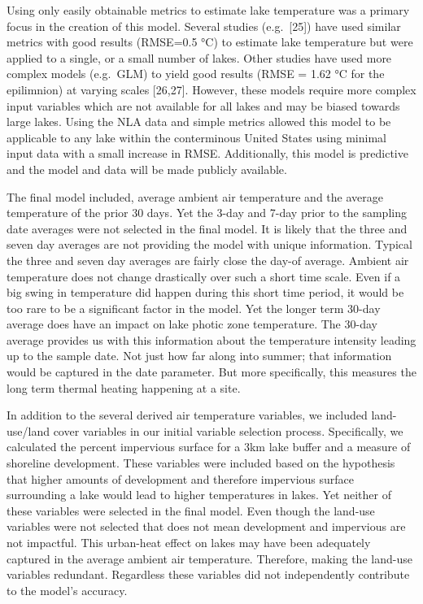 \documentclass[
]{article}
\begin{document}
Using only easily obtainable metrics to estimate lake temperature was a
primary focus in the creation of this model. Several studies
(e.g.~{[}25{]}) have used similar metrics with good results (RMSE=0.5
°C) to estimate lake temperature but were applied to a single, or a
small number of lakes. Other studies have used more complex models
(e.g.~GLM) to yield good results (RMSE = 1.62 °C for the epilimnion) at
varying scales {[}26,27{]}. However, these models require more complex
input variables which are not available for all lakes and may be biased
towards large lakes. Using the NLA data and simple metrics allowed this
model to be applicable to any lake within the conterminous United States
using minimal input data with a small increase in RMSE. Additionally,
this model is predictive and the model and data will be made publicly
available.

The final model included, average ambient air temperature and the
average temperature of the prior 30 days. Yet the 3-day and 7-day prior
to the sampling date averages were not selected in the final model. It
is likely that the three and seven day averages are not providing the
model with unique information. Typical the three and seven day averages
are fairly close the day-of average. Ambient air temperature does not
change drastically over such a short time scale. Even if a big swing in
temperature did happen during this short time period, it would be too
rare to be a significant factor in the model. Yet the longer term 30-day
average does have an impact on lake photic zone temperature. The 30-day
average provides us with this information about the temperature
intensity leading up to the sample date. Not just how far along into
summer; that information would be captured in the date parameter. But
more specifically, this measures the long term thermal heating happening
at a site.

In addition to the several derived air temperature variables, we
included land-use/land cover variables in our initial variable selection
process. Specifically, we calculated the percent impervious surface for
a 3km lake buffer and a measure of shoreline development. These
variables were included based on the hypothesis that higher amounts of
development and therefore impervious surface surrounding a lake would
lead to higher temperatures in lakes. Yet neither of these variables
were selected in the final model. Even though the land-use variables
were not selected that does not mean development and impervious are not
impactful. This urban-heat effect on lakes may have been adequately
captured in the average ambient air temperature. Therefore, making the
land-use variables redundant. Regardless these variables did not
independently contribute to the model's accuracy.
\end{document}
